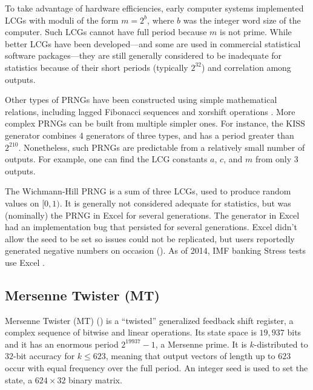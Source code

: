 \documentclass[graybox]{svmult}
\newcommand{\todo}[1]{{\color{red}{TO DO: \sc #1}}}
\begin{document}
To take advantage of hardware efficiencies, early computer systems implemented LCGs 
with moduli of the form 
$m = 2^b$, where
$b$ was the integer word size of the computer.
Such LCGs cannot have full period because $m$ is not prime. 
While better LCGs have been developed---and some are used in commercial statistical software packages---they are still
generally considered to be inadequate for statistics because of their short periods (typically $2^{32}$) 
and correlation among outputs.

Other types of PRNGs have been constructed using simple mathematical relations,
including lagged Fibonacci sequences and xorshift operations \todo{CITE}.
More complex PRNGs can be built from multiple simpler ones.
For instance, the KISS generator combines 4 generators of three types, and has a period greater than $2^{210}$.
Nonetheless, such PRNGs are predictable from a relatively small number of outputs.
For example, one can find the LCG constants $a$, $c$, and $m$ from only 3 outputs.

The Wichmann-Hill PRNG is a sum of three LCGs, used to produce random values on $[0, 1)$.
%
It is generally not considered adequate for statistics, but was (nominally) the PRNG in Excel for several generations. 
The generator in Excel had an implementation bug that persisted for several generations.
Excel didn't allow the seed to be set so issues could not be replicated, but users reportedly generated negative numbers on occasion (\cite{mccullough_microsoft_2008}).
As of 2014, IMF banking Stress tests use Excel \cite{ong14}.

\subsection{Mersenne Twister (MT)}

Mersenne Twister (MT) (\cite{matsumoto_mersenne_1998}) is a ``twisted'' generalized feedback shift register, a complex sequence of bitwise and linear operations.
Its state space is $19,937$ bits and it has an enormous period $2^{19937}-1$, a Mersenne prime.
It is $k$-distributed to $32$-bit accuracy for $k \leq 623$, meaning that output vectors of length up to $623$ occur with equal frequency over the full period.
An integer seed is used to set the state, a $624 \times 32$ binary matrix.
\end{document}
